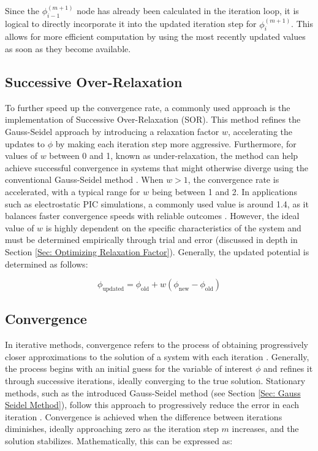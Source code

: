Since the $\phi_{i-1}^{(m+1)}$ node has already been calculated in the iteration loop, it is logical to directly incorporate it into the updated iteration step for $\phi_i^{(m+1)}$. This allows for more efficient computation by using the most recently updated values as soon as they become available.


\subsection{Successive Over-Relaxation}\label{Sub: Successive Over-Relaxation}

To further speed up the convergence rate, a commonly used approach is the implementation of Successive Over-Relaxation (\acs{SOR}). This method refines the Gauss-Seidel approach by introducing a relaxation factor $w$, accelerating the updates to $\phi$ by making each iteration step more aggressive. Furthermore, for values of $w$ between 0 and 1, known as under-relaxation, the method can help achieve successful convergence in systems that might otherwise diverge using the conventional Gauss-Seidel method \cite{allahviranloo_successive_2005}. When $w > 1$, the convergence rate is accelerated, with a typical range for $w$ being between 1 and 2. In applications such as electrostatic \acs{PIC} simulations, a commonly used value is around 1.4, as it balances faster convergence speeds with reliable outcomes \cite{brieda_plasma_2019}. However, the ideal value of $w$ is highly dependent on the specific characteristics of the system and must be determined empirically through trial and error (discussed in depth in Section \ref{Sec: Optimizing Relaxation Factor}). Generally, the updated potential is determined as follows:

\begin{equation}
\phi_\mathrm{updated} = \phi_\mathrm{old} + w (\phi_\mathrm{new} - \phi_\mathrm{old})
\end{equation}


\subsection{Convergence}\label{Sec: Convergence}

In iterative methods, convergence refers to the process of obtaining progressively closer approximations to the solution of a system with each iteration \cite{barrett_templates_1994}. Generally, the process begins with an initial guess for the variable of interest $\phi$ and refines it through successive iterations, ideally converging to the true solution. Stationary methods, such as the introduced Gauss-Seidel method (see Section \ref{Sec: Gauss Seidel Method}), follow this approach to progressively reduce the error in each iteration \cite{barrett_templates_1994}. Convergence is achieved when the difference between iterations diminishes, ideally approaching zero as the iteration step $m$ increases, and the solution stabilizes. Mathematically, this can be expressed as:


